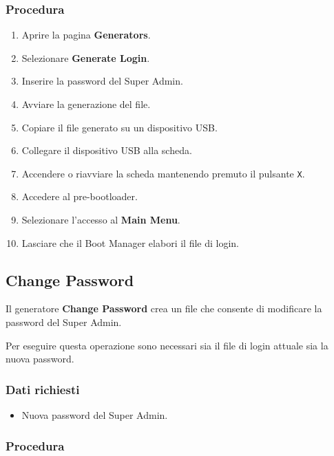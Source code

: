 \documentclass[11pt,a4paper]{article}
\newcommand{\button}[1]{\textbf{#1}}
\begin{document}
\subsubsection*{Procedura}

\begin{enumerate}
    \item Aprire la pagina \button{Generators}.
    \item Selezionare \button{Generate Login}.
    \item Inserire la password del Super Admin.
    \item Avviare la generazione del file.
    \item Copiare il file generato su un dispositivo USB.
    \item Collegare il dispositivo USB alla scheda.
    \item Accendere o riavviare la scheda mantenendo premuto
    il pulsante \texttt{X}.
    \item Accedere al pre-bootloader.
    \item Selezionare l'accesso al \textbf{Main Menu}.
    \item Lasciare che il Boot Manager elabori il file di login.
\end{enumerate}

\subsection{Change Password}

Il generatore \button{Change Password} crea un file che consente
di modificare la password del Super Admin.

Per eseguire questa operazione sono necessari sia il file di login
attuale sia la nuova password.

\subsubsection*{Dati richiesti}

\begin{itemize}
    \item Nuova password del Super Admin.
\end{itemize}

\subsubsection*{Procedura}
\end{document}
